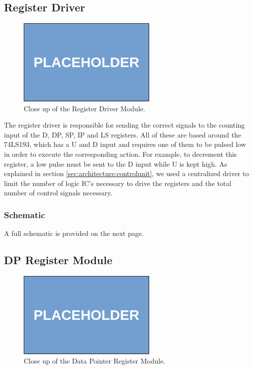 \subsection{Register Driver} \label{sec:implementation:registerdriver}
\begin{figure}[H]
  \centering
  \includegraphics[width=0.6\textwidth]{img/placeholder}
  \caption{Close up of the Register Driver Module.}
  \label{fig:registerdrivercloseup}
\end{figure}
The register driver is responsible for sending the correct signals to the counting input of the D, DP, SP, IP and LS registers. All of these are based around the 74LS193, which has a U and D input and requires one of them to be pulsed low in order to execute the corresponding action. For example, to decrement this register, a low pulse must be sent to the D input while U is kept high. As explained in section \ref{sec:architecture:controlunit}, we used a centralized driver to limit the number of logic IC's necessary to drive the registers and the total number of control signals necessary.

\subsubsection{Schematic}
A full schematic is provided on the next page.



\subsection{DP Register Module}
\begin{figure}[H]
  \centering
  \includegraphics[width=0.6\textwidth]{img/placeholder}
  \caption{Close up of the Data Pointer Register Module.}
  \label{fig:dpregcloseup}
\end{figure}

